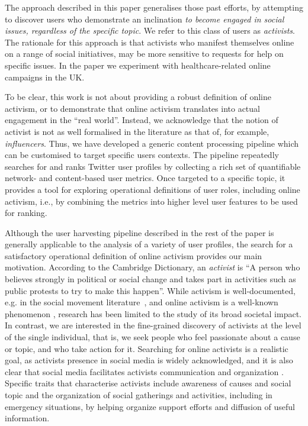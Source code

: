 \documentclass[runningheads]{llncs}
\begin{document}
The approach described in this paper generalises those past efforts, by attempting to discover users who demonstrate an inclination \textit{to become engaged in social issues, regardless of the specific topic}.
We refer to this class of users as \textit{activists}.
The rationale for this approach is that activists who manifest themselves online on a range of social initiatives, may be more sensitive to requests for help on specific issues. 
In the paper we experiment with healthcare-related online campaigns in the UK.

To be clear, this work is not about providing a robust definition of online activism, or to demonstrate that online activism translates into actual engagement in the ``real world''.
%
Instead, we acknowledge that the notion of activist is not as well formalised in the literature as that of, for example, \textit{influencers}. 
Thus, we have developed a generic content processing pipeline which can be customised to target specific users contexts. 
The pipeline repeatedly searches for and ranks Twitter user profiles by collecting a rich set of quantifiable network- and content-based user metrics. 
Once targeted to a specific topic, it provides a tool for exploring operational definitions of user roles, including online activism, i.e., by combining the metrics into higher level user features to be used for ranking.

Although the user harvesting pipeline described in the rest of the paper is generally applicable to the analysis of a variety of user profiles, the search for a satisfactory operational definition of online activism 
provides our main motivation. 
%
According to the Cambridge Dictionary, an \textit{activist} is ``A person who believes strongly in political or social change and takes part in activities such as public protests to try to make this happen''.
%
While activism is well-documented, e.g. in the social movement literature~\cite{doi:10.1080/14742830701497277}, and online activism is a well-known phenomenon \cite{IJoC1246}, research has been limited to the study of its broad societal impact. 
In contrast, we are interested in the fine-grained discovery of activists at the level of the single individual, that is, we seek people who feel passionate about a cause or topic, and who take action for it. 
Searching for online activists is a realistic goal, as activists presence in social media is widely acknowledged, and it is also clear that social media facilitates activists communication and organization \cite{Poell2014,Youmans2012}. 
Specific traits that characterise activists include awareness of causes and social topic and the organization of social gatherings and activities, including in emergency situations, by helping organize support efforts and diffusion of useful information.
 
\end{document}
